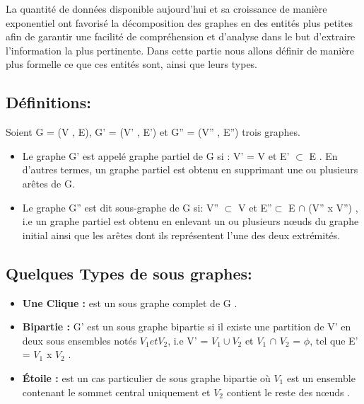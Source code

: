 
	La quantité de données disponible aujourd'hui et sa croissance de manière exponentiel ont favorisé la décomposition des graphes en des entités plus petites afin de garantir une facilité de compréhension et d'analyse dans le but d'extraire l'information la plus pertinente. Dans cette partie nous allons définir de manière plus formelle ce que ces entités sont, ainsi que leurs types.
	
		
		
		
		\subsection{Définitions:}
		Soient G = (V , E), G' = (V' , E') et G'' = (V'' , E'') trois graphes.
		\begin{itemize}[label=$\circ$]
		
			\item Le graphe G' est appelé graphe partiel de G si : V' = V et E' $\subset$ E \citep{DUT}. En d'autres termes, un graphe partiel est obtenu en supprimant une ou plusieurs arêtes de G.
				

			\item Le graphe G'' est dit sous-graphe de G si: V'' $\subset$ V et 
			 E''$\subset$ E $\cap$ (V'' x V'') \citep{bac}, i.e un graphe partiel est obtenu en enlevant un ou plusieurs nœuds du graphe initial ainsi que les arêtes dont ils représentent l'une des deux extrémités.
			 
		\end{itemize}
		
		\subsection{Quelques Types de sous graphes:}
		
		\begin{itemize} [label = $\bullet$]
		
		
			\item \textbf{Une Clique :} est un sous graphe complet de G \citep{bac}.
			
			\item \textbf{Bipartie :} G' est un sous graphe bipartie si il existe une partition de V' en deux sous ensembles notés $V_{1} et V_{2}$, i.e V' = $V_{1} \cup V_{2}$ et $V_{1}$ $\cap$ $V_{2}$ = $\phi$, tel que E' = $V_{1}$ x $V_{2}$ \citep{bac}.
			
			\item \textbf{Étoile :}
			 est un cas particulier de sous graphe bipartie où $V_{1}$ est un ensemble contenant le sommet central uniquement et $V_{2}$ contient le reste des nœuds \citep{koutra2015summarizing} .
			 
		
			 
		\end{itemize}